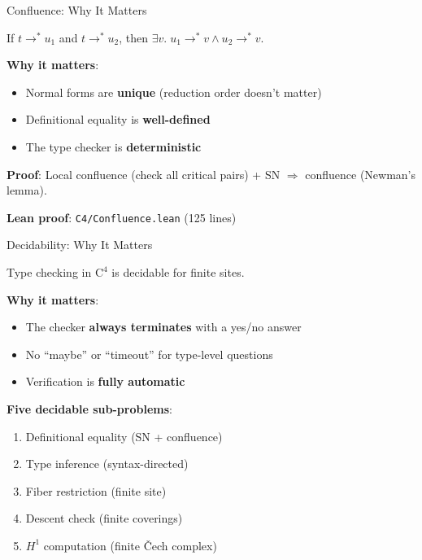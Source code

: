 \documentclass[aspectratio=169,11pt]{beamer}
\newcommand{\Cfour}{\mathrm{C}^4}
\begin{document}
\begin{frame}{Confluence: Why It Matters}
\begin{theorem}
If $t \to^* u_1$ and $t \to^* u_2$, then $\exists v.\; u_1 \to^* v \land u_2 \to^* v$.
\end{theorem}

\vspace{0.5em}
\textbf{Why it matters}:
\begin{itemize}
\item Normal forms are \textbf{unique} (reduction order doesn't matter)
\item Definitional equality is \textbf{well-defined}
\item The type checker is \textbf{deterministic}
\end{itemize}

\vspace{0.5em}
\textbf{Proof}: Local confluence (check all critical pairs) + SN $\Rightarrow$ confluence (Newman's lemma).

\vspace{0.3em}
\textbf{Lean proof}: \texttt{C4/Confluence.lean} (125 lines)
\end{frame}

\begin{frame}{Decidability: Why It Matters}
\begin{theorem}
Type checking in $\Cfour$ is decidable for finite sites.
\end{theorem}

\vspace{0.5em}
\textbf{Why it matters}:
\begin{itemize}
\item The checker \textbf{always terminates} with a yes/no answer
\item No ``maybe'' or ``timeout'' for type-level questions
\item Verification is \textbf{fully automatic}
\end{itemize}

\vspace{0.5em}
\textbf{Five decidable sub-problems}:
\begin{enumerate}
\item Definitional equality (SN + confluence)
\item Type inference (syntax-directed)
\item Fiber restriction (finite site)
\item Descent check (finite coverings)
\item $H^1$ computation (finite \v{C}ech complex)
\end{enumerate}
\end{frame}
\end{document}
